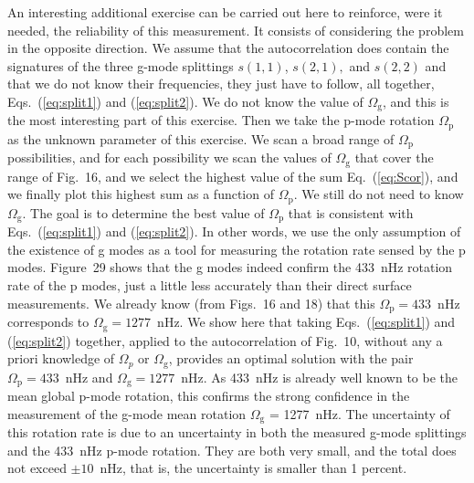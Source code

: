 \documentclass[bibyear]{aa}
\begin{document}
 An interesting additional exercise can be carried out here to reinforce, were it needed, the reliability of this measurement. It consists of considering the problem in the opposite direction. We assume that the autocorrelation does contain the signatures of the three g-mode splittings $s(1,1)$, $s(2,1),$ and $s(2,2)$ and that we do not know their frequencies, they just have to follow, all together, Eqs.~(\ref{eq:split1}) and (\ref{eq:split2}). We do not know  the value of $\Omega_\mathrm{g}$, and this is the most interesting part of this exercise. Then we take the p-mode rotation  $\Omega_\mathrm{p}$ as the unknown parameter of this exercise. We scan a broad range of  $\Omega_\mathrm{p}$ possibilities, and for each possibility we scan the values of $\Omega_\mathrm{g}$ that cover the range of Fig.~16, and we select the highest value of the sum Eq.~(\ref{eq:Scor}), and we finally plot this highest sum as a function of $\Omega_\mathrm{p}$. We still do not need to know $\Omega_\mathrm{g}$. The goal is to determine the best value of $\Omega_\mathrm{p}$ that is consistent with Eqs.~(\ref{eq:split1}) and (\ref{eq:split2}). In other words, we use the only assumption of the  existence of g modes as a tool for measuring the rotation rate sensed by the p modes.  Figure~29 shows that the g modes indeed confirm the 433~nHz rotation rate of the p modes, just a little less accurately than their direct surface measurements. 
We already know (from Figs.~16 and 18) that this $\Omega_\mathrm{p} = 433$~nHz corresponds to $\Omega_\mathrm{g} = 1277$~nHz. We show here that taking Eqs.~(\ref{eq:split1}) and (\ref{eq:split2}) together,
applied to the autocorrelation of Fig.~10, without any a priori knowledge of $\Omega_p$ or $\Omega_\mathrm{g}$, provides an optimal solution with the pair $\Omega_\mathrm{p} = 433$~nHz and $\Omega_\mathrm{g} = 1277$~nHz. As 433~nHz is already well known to be the mean global p-mode rotation, this confirms the strong confidence in the measurement of the g-mode mean rotation $\Omega_\mathrm{g}$ = 1277~nHz.
The uncertainty of this rotation rate is due to an uncertainty in both the measured g-mode splittings and the 433~nHz p-mode rotation. They are both very small, and the total does not exceed $\pm 10$~nHz, that is, the uncertainty is smaller than 1 percent.
 
\end{document}
